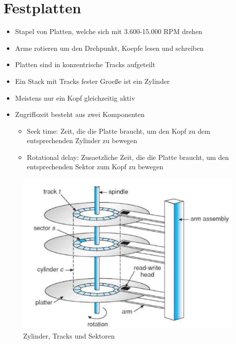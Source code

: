 \documentclass[a4paper]{scrreprt}
\begin{document}
\section{Festplatten}
\begin{itemize}
	\item Stapel von Platten, welche sich mit 3.600-15.000 RPM drehen
	\item Arme rotieren um den Drehpunkt, Koepfe lesen und schreiben
	\item Platten sind in konzentrische Tracks aufgeteilt
	\item Ein Stack mit Tracks fester Groeße ist ein Zylinder
	\item Meistens nur ein Kopf gleichzeitig aktiv
	\item Zugriffszeit besteht aus zwei Komponenten
		\begin{itemize}
			\item Seek time: Zeit, die die Platte braucht, um den Kopf zu dem entsprechenden Zylinder zu bewegen
			\item Rotational delay: Zusaetzliche Zeit, die die Platte braucht, um den entsprechenden Sektor zum Kopf zu bewegen
		\end{itemize}
\end{itemize}

\begin{figure}[ht]
\centering
\includegraphics[scale=0.3]{graphics/harddisk.png}
\caption{Zylinder, Tracks und Sektoren}
\end{figure}
\end{document}
